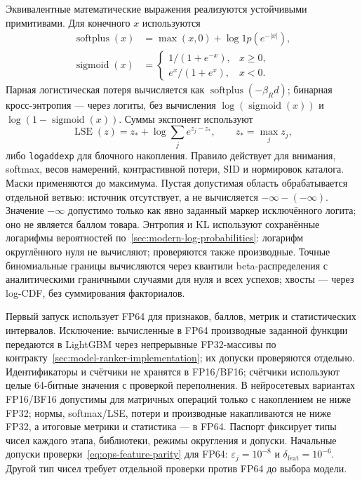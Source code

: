 \documentclass[12pt,a4paper]{article}
\newcommand{\code}[1]{{\ttfamily\small\nolinkurl{#1}}}
\newcommand{\eps}{\varepsilon}
\DeclareMathOperator{\sigmoid}{sigmoid}
\theoremstyle{plainru}
\begin{document}
Эквивалентные математические выражения реализуются устойчивыми
примитивами. Для конечного $x$ используются
\begin{align}
\operatorname{softplus}(x)&=\max(x,0)+\log1p(e^{-|x|}),\\
\sigmoid(x)&=\begin{cases}
1/(1+e^{-x}),&x\ge0,\\
e^x/(1+e^x),&x<0.
\end{cases}
\end{align}
Парная логистическая потеря вычисляется как
$\operatorname{softplus}(-\beta_R d)$; бинарная кросс-энтропия ---
через логиты, без вычисления $\log(\sigmoid(x))$ и
$\log(1-\sigmoid(x))$. Суммы экспонент используют
\begin{equation}\label{eq:ops-stable-lse}
\operatorname{LSE}(z)=z_*+\log\sum_j e^{z_j-z_*},
\qquad z_*=\max_j z_j,
\end{equation}
либо \code{logaddexp} для блочного накопления. Правило действует
для внимания, softmax, весов намерений, контрастивной потери, SID
и нормировок каталога. Маски применяются до максимума. Пустая допустимая область
обрабатывается отдельной ветвью: источник отсутствует, а не вычисляется
$-\infty-(-\infty)$. Значение $-\infty$ допустимо только как явно
заданный маркер исключённого логита; оно не является баллом товара.
Энтропия и KL используют сохранённые логарифмы вероятностей
по~\ref{sec:modern-log-probabilities}: логарифм округлённого нуля
не вычисляют; проверяются также производные.
Точные биномиальные границы вычисляются через квантили beta-распределения
с аналитическими граничными случаями для нуля и всех успехов;
хвосты --- через log-CDF, без суммирования факториалов.

Первый запуск использует FP64 для признаков, баллов,
метрик и статистических интервалов. Исключение: вычисленные в FP64
производные заданной функции передаются в LightGBM через непрерывные
FP32-массивы по контракту~\ref{sec:model-ranker-implementation};
их допуски проверяются отдельно. Идентификаторы и счётчики не
хранятся в FP16/BF16; счётчики используют целые 64-битные значения
с проверкой переполнения. В нейросетевых вариантах FP16/BF16
допустимы для матричных операций только с накоплением не ниже FP32;
нормы, softmax/LSE, потери и производные накапливаются не ниже FP32,
а итоговые метрики и статистика --- в FP64. Паспорт фиксирует
типы чисел каждого этапа, библиотеки, режимы округления и допуски.
Начальные допуски проверки~\eqref{eq:ops-feature-parity} для FP64:
$\eps_j=10^{-8}$ и $\delta_{\mathrm{feat}}=10^{-6}$.
Другой тип чисел требует отдельной проверки против FP64 до выбора модели.
\end{document}
